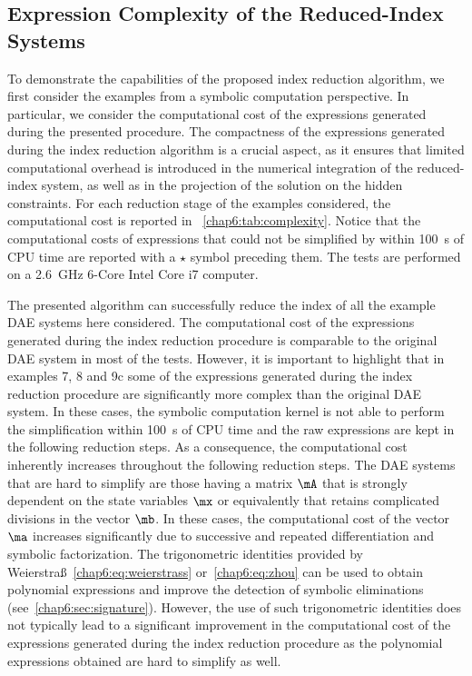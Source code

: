 \subsection{Expression Complexity of the Reduced-Index Systems}
\label{chap6:sec:daes_complexity}

To demonstrate the capabilities of the proposed index reduction algorithm, we first consider the examples from a symbolic computation perspective. In particular, we consider the computational cost of the expressions generated during the presented procedure. The compactness of the expressions generated during the index reduction algorithm is a crucial aspect, as it ensures that limited computational overhead is introduced in the numerical integration of the reduced-index system, as well as in the projection of the solution on the hidden constraints. For each reduction stage of the examples considered, the computational cost is reported in \tablename{}~\ref{chap6:tab:complexity}. Notice that the computational costs of expressions that could not be simplified by \Maple{} within \SI{100}{\second} of CPU time are reported with a $\star$ symbol preceding them. The tests are performed on a \SI{2.6}{\giga\hertz} 6-Core Intel\textsuperscript{\textregistered} Core\textsuperscript{\textregistered} i7 computer.

The presented algorithm can successfully reduce the index of all the example \ac{DAE} systems here considered. The computational cost of the expressions generated during the index reduction procedure is comparable to the original \ac{DAE} system in most of the tests. However, it is important to highlight that in examples 7, 8 and 9c some of the expressions generated during the index reduction procedure are significantly more complex than the original \ac{DAE} system. In these cases, the \Maple{} symbolic computation kernel is not able to perform the simplification within \SI{100}{\second} of CPU time and the raw expressions are kept in the following reduction steps. As a consequence, the computational cost inherently increases throughout the following reduction steps. The \ac{DAE} systems that are hard to simplify are those having a matrix $\mA$ that is strongly dependent on the state variables $\mx$ or equivalently that retains complicated divisions in the vector $\mb$. In these cases, the computational cost of the vector $\ma$ increases significantly due to successive and repeated differentiation and symbolic factorization. The trigonometric identities provided by Weierstra{\ss}~\eqref{chap6:eq:weierstrass} or~\eqref{chap6:eq:zhou} can be used to obtain polynomial expressions and improve the detection of symbolic eliminations (see~\ref{chap6:sec:signature}). However, the use of such trigonometric identities does not typically lead to a significant improvement in the computational cost of the expressions generated during the index reduction procedure as the polynomial expressions obtained are hard to simplify as well.

